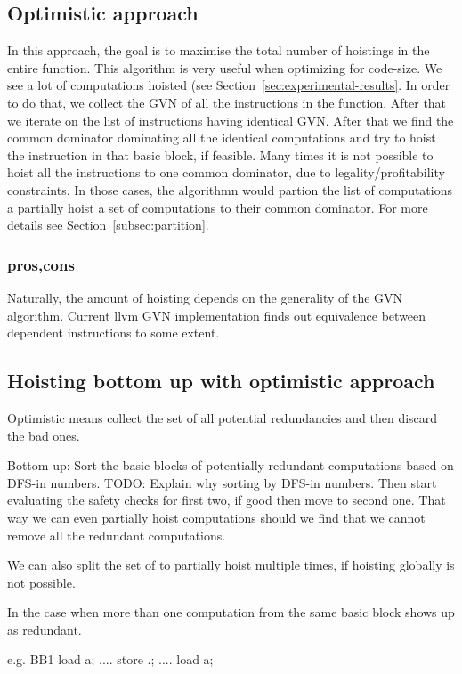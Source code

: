 \documentclass{sig-alternate}
\begin{document}
\subsection{Optimistic approach}
In this approach, the goal is to maximise the total number of hoistings in the
entire function.  This algorithm is very useful when optimizing for code-size.
We see a lot of computations hoisted (see
Section~\ref{sec:experimental-results}. In order to do that, we collect the GVN
of all the instructions in the function. After that we iterate on the list of
instructions having identical GVN. After that we find the common dominator
dominating all the identical computations and try to hoist the instruction in
that basic block, if feasible. Many times it is not possible to hoist all the
instructions to one common dominator, due to legality/profitability
constraints. In those cases, the algorithmn would partion the list of
computations a partially hoist a set of computations to their common
dominator. For more details see Section~\ref{subsec:partition}.


\subsubsection{pros,cons}
Naturally, the amount of hoisting depends on the generality of the GVN
algorithm. Current llvm GVN implementation finds out equivalence between
dependent instructions to some extent.


\subsection{Hoisting bottom up with optimistic approach}
Optimistic means collect the set of all potential redundancies and
then discard the bad ones.

Bottom up: Sort the basic blocks of potentially redundant computations
based on DFS-in numbers.  TODO: Explain why sorting by DFS-in numbers.
Then start evaluating the safety checks for first two, if good then
move to second one. That way we can even partially hoist computations
should we find that we cannot remove all the redundant computations.

We can also split the set of to partially hoist multiple times, if
hoisting globally is not possible.

In the case when more than one computation from the same basic block
shows up as redundant.

e.g.
BB1
load a;
....
store .;
....
load a;
\end{document}
